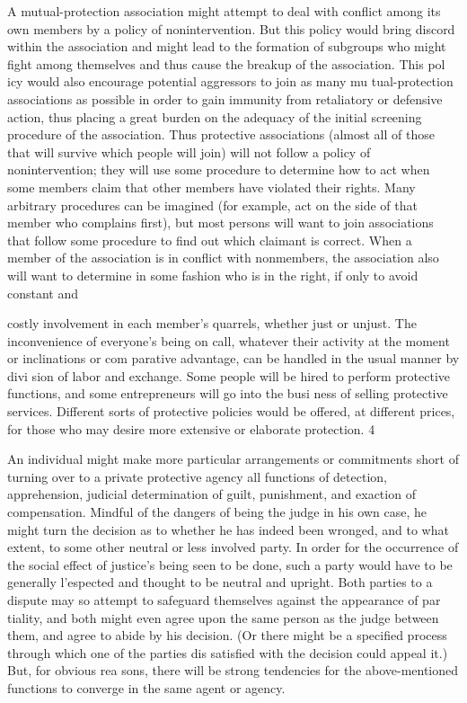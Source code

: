 \documentclass[11pt,openany]{book}
\begin{document}
A mutual-protection association might attempt to deal with conflict among its own members by a policy of nonintervention. But this policy would bring discord within the association and might lead to the formation of subgroups who might fight among themselves and thus cause the breakup of the association. This pol icy would also encourage potential aggressors to join as many mu tual-protection associations as possible in order to gain immunity from retaliatory or defensive action, thus placing a great burden on the adequacy of the initial screening procedure of the association. Thus protective associations (almost all of those that will survive which people will join) will not follow a policy of nonintervention; they will use some procedure to determine how to act when some members claim that other members have violated their rights. Many arbitrary procedures can be imagined (for example, act on the side of that member who complains first), but most persons will want to join associations that follow some procedure to find out which claimant is correct. When a member of the association is in conflict with nonmembers, the association also will want to determine in some fashion who is in the right, if only to avoid constant and 

costly involvement in each member's quarrels, whether just or unjust. The inconvenience of everyone's being on call, whatever their activity at the moment or inclinations or com parative advantage, can be handled in the usual manner by divi sion of labor and exchange. Some people will be hired to perform protective functions, and some entrepreneurs will go into the busi ness of selling protective services. Different sorts of protective policies would be offered, at different prices, for those who may desire more extensive or elaborate protection. 4 

An individual might make more particular arrangements or commitments short of turning over to a private protective agency all functions of detection, apprehension, judicial determination of guilt, punishment, and exaction of compensation. Mindful of the dangers of being the judge in his own case, he might turn the decision as to whether he has indeed been wronged, and to what extent, to some other neutral or less involved party. In order for the occurrence of the social effect of justice's being seen to be done, such a party would have to be generally l'espected and thought to be neutral and upright. Both parties to a dispute may so attempt to safeguard themselves against the appearance of par tiality, and both might even agree upon the same person as the judge between them, and agree to abide by his decision. (Or there might be a specified process through which one of the parties dis satisfied with the decision could appeal it.) But, for obvious rea sons, there will be strong tendencies for the above-mentioned functions to converge in the same agent or agency. 
\end{document}
